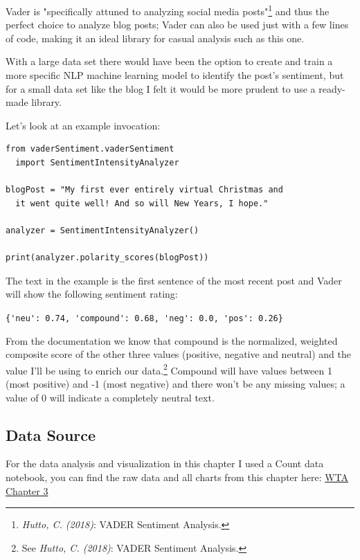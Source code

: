 Vader is "specifically attuned to analyzing social media posts"\footnote{\textit{Hutto, C. (2018)}: VADER Sentiment Analysis.\cite{vaderReadme}} and thus the perfect choice to analyze blog posts; Vader can also be used just with a few lines of code, making it an ideal library for casual analysis such as this one. 

With a large data set there would have been the option to create and train a more specific NLP machine learning model to identify the post's sentiment, but for a small data set like the blog I felt it would be more prudent to use a ready-made library.

Let's look at an example invocation:

\begin{lstlisting}[caption=Vader Example, frame=single, basicstyle=\ttfamily]
from vaderSentiment.vaderSentiment 
  import SentimentIntensityAnalyzer

blogPost = "My first ever entirely virtual Christmas and 
  it went quite well! And so will New Years, I hope."

analyzer = SentimentIntensityAnalyzer()

print(analyzer.polarity_scores(blogPost))

\end{lstlisting}

The text in the example is the first sentence of the most recent post and Vader will show the following sentiment rating:

\verb|{'neu': 0.74, 'compound': 0.68, 'neg': 0.0, 'pos': 0.26}|

From the documentation we know that compound is the normalized, weighted composite score of the other three values (positive, negative and neutral) and the value I'll be using to enrich our data.\footnote{See \textit{Hutto, C. (2018)}: VADER Sentiment Analysis.\cite{vaderReadme}} Compound will have values between 1 (most positive) and -1 (most negative) and there won't be any missing values; a value of 0 will indicate a completely neutral text.

\subsection{Data Source}

For the data analysis and visualization in this chapter I used a Count data notebook, you can find the raw data and all charts from this chapter here: \href{https://count.co/n/6WKuBzDV4Qq}{WTA Chapter 3}

